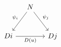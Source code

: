 \documentclass[border=6pt]{standalone}
\begin{document}
$
\begin{tikzcd}[column sep=small, row sep=large]
  & N \arrow[dl, "\psi_i"'] \arrow[dr, "\psi_j"] & \\
  Di \arrow[rr, "D(u)"'] & & Dj
\end{tikzcd}
$
\end{document}
